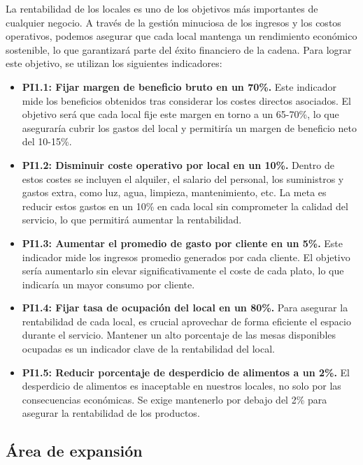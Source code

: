 \documentclass[12pt]{opticajnl}
\begin{document}
La rentabilidad de los locales es uno de los objetivos más importantes de cualquier negocio. A través de la gestión minuciosa de los ingresos y los costos operativos, podemos asegurar que cada local mantenga un rendimiento económico sostenible, lo que garantizará parte del éxito financiero de la cadena. Para lograr este objetivo, se utilizan los siguientes indicadores:

\begin{itemize}
    \item \textbf{PI1.1: Fijar margen de beneficio bruto en un 70\%.} Este indicador mide los beneficios obtenidos tras considerar los costes directos asociados. El objetivo será que cada local fije este margen en torno a un 65-70\%, lo que aseguraría cubrir los gastos del local y permitiría un margen de beneficio neto del 10-15\%. 
    \item \textbf{PI1.2: Disminuir coste operativo por local en un 10\%.} Dentro de estos costes se incluyen el alquiler, el salario del personal, los suministros y gastos extra, como luz, agua, limpieza, mantenimiento, etc. La meta es reducir estos gastos en un 10\% en cada local sin comprometer la calidad del servicio, lo que permitirá aumentar la rentabilidad.
    \item \textbf{PI1.3: Aumentar el promedio de gasto por cliente en un 5\%.} Este indicador mide los ingresos promedio generados por cada cliente. El objetivo sería aumentarlo sin elevar significativamente el coste de cada plato, lo que indicaría un mayor consumo por cliente. 
    \item \textbf{PI1.4: Fijar tasa de ocupación del local en un 80\%.} Para asegurar la rentabilidad de cada local, es crucial aprovechar de forma eficiente el espacio durante el servicio. Mantener un alto porcentaje de las mesas disponibles ocupadas es un indicador clave de la rentabilidad del local.
    \item \textbf{PI1.5: Reducir porcentaje de desperdicio de alimentos a un 2\%.} El desperdicio de alimentos es inaceptable en nuestros locales, no solo por las consecuencias económicas. Se exige mantenerlo por debajo del 2\% para asegurar la rentabilidad de los productos. 
\end{itemize}






\subsection{Área de expansión}
\end{document}
